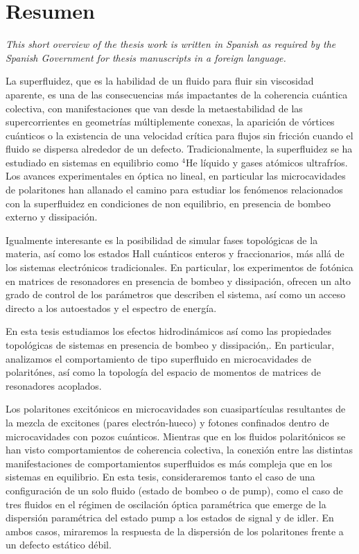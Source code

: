\chapter*{Resumen}


\textit{This short overview of the thesis work is written in Spanish as required by the Spanish Government for thesis manuscripts in a foreign language.}

La superfluidez, que es la habilidad de un fluido para fluir sin
viscosidad aparente, es una de las consecuencias m\'as impactantes de
la coherencia cu\'antica colectiva, con manifestaciones que van desde
la metaestabilidad de las supercorrientes en geometr\'ias
m\'ultiplemente conexas, la aparici\'on de v\'ortices cu\'anticos o la
existencia de una velocidad cr\'itica para flujos sin fricci\'on
cuando el fluido se dispersa alrededor de un
defecto. Tradicionalmente, la superfluidez se ha estudiado en sistemas
en equilibrio como $^4$He l\'iquido y gases at\'omicos
ultrafr\'ios. Los avances experimentales en \'optica no lineal, en
particular las microcavidades de polaritones han allanado el camino
para estudiar los fen\'omenos relacionados con la superfluidez en
condiciones de non equilibrio, en presencia de bombeo externo y
dissipaci\'on.

Igualmente interesante es la posibilidad de simular fases
topol\'ogicas de la materia, as\'i como los estados Hall cu\'anticos
enteros y fraccionarios, m\'as all\'a de los sistemas electr\'onicos
tradicionales. En particular, los experimentos de fot\'onica en
matrices de resonadores en presencia de bombeo y dissipaci\'on,
ofrecen un alto grado de control de los par\'ametros que describen el
sistema, as\'i como un acceso directo a los autoestados y el espectro
de energ\'ia.

En esta tesis estudiamos los efectos hidrodin\'amicos as\'i como las
propiedades topol\'ogicas de sistemas en presencia de bombeo y
dissipaci\'on,. En particular, analizamos el comportamiento de tipo
superfluido en microcavidades de polarit\'ones, as\'i como la
topolog\'ia del espacio de momentos de matrices de resonadores
acoplados.

Los polaritones excit\'onicos en microcavidades son cuasipart\'iculas
resultantes de la mezcla de excitones (pares electr\'on-hueco) y
fotones confinados dentro de microcavidades con pozos
cu\'anticos. Mientras que en los fluidos polarit\'onicos se han visto
comportamientos de coherencia colectiva, la conexi\'on entre las
distintas manifestaciones de comportamientos superfluidos es m\'as
compleja que en los sistemas en equilibrio. En esta tesis,
consideraremos tanto el caso de una configuraci\'on de un solo fluido
(estado de bombeo o de pump), como el caso de tres fluidos en el
r\'egimen de oscilaci\'on \'optica param\'etrica que emerge de la
dispersi\'on param\'etrica del estado pump a los estados de signal y
de idler. En ambos casos, miraremos la respuesta de la dispersi\'on de
los polaritones frente a un defecto est\'atico d\'ebil.

